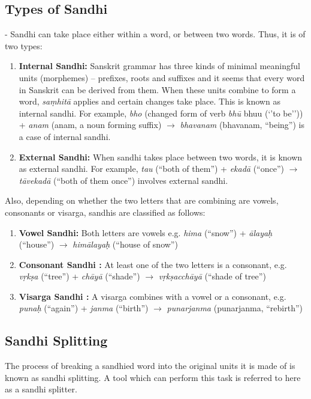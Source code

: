 \documentclass[11pt]{article}
\begin{document}
\subsection{Types of Sandhi} - Sandhi can take place either within a word, or between two words. Thus, it is of two types:
\begin{enumerate}
\item \textbf{Internal Sandhi:} Sanskrit grammar has three kinds of minimal meaningful units (morphemes) – prefixes, roots and suffixes and it seems that every word in Sanskrit can be derived from them. When these units combine to form a word, \textit{sa\d{m}hit\={a}} applies and certain changes take place. This is known as internal sandhi.
For example, \textit{ bho} (changed form of verb \textit{bh\={u}} bhuu (‘’to be’’)) + \textit{anam} (anam, a noun forming suffix) $\rightarrow$ \textit{bhavanam }(bhavanam, “being”) is a case of internal sandhi.

\item \textbf{External Sandhi:}
When sandhi takes place between two words, it is known as external sandhi. For example,
\textit{tau} (``both of them'') + \textit{ekad\={a}} (``once'') $\rightarrow$ \textit{t\={a}vekad\={a}} (``both of them once'') involves external sandhi.

\end{enumerate}



    
Also, depending on whether the two letters that are combining are vowels, consonants or visarga, sandhis are classified as follows:
\begin{enumerate}
\item \textbf{Vowel Sandhi:} Both letters are vowels e.g. \textit{ hima} (``snow'') + \textit{ \={a}laya\d{h}} (``house'') $\rightarrow$ \textit{him\={a}laya\d{h}} (``house of snow'')
\item \textbf{Consonant Sandhi :}  At least one of the two letters is a consonant, e.g. \textit{v\d{r}k\d{s}a} (``tree'') + \textit{ch\={a}y\={a} }(``shade'') $\rightarrow$ \textit{v\d{r}k\d{s}acch\={a}y\={a}} (``shade of tree'') 
\item \textbf{Visarga Sandhi :} A visarga combines with a vowel or a consonant, e.g.  \textit{ puna\d{h} }(``again'') + \textit{janma }(``birth'') $\rightarrow$ \textit{punarjanma} (punarjanma, “rebirth”)

\end{enumerate}


\subsection{Sandhi Splitting}
The process of breaking a sandhied word into the original units it is made of is known as sandhi splitting. A tool which can perform this task is referred to here as a sandhi splitter.
\end{document}
